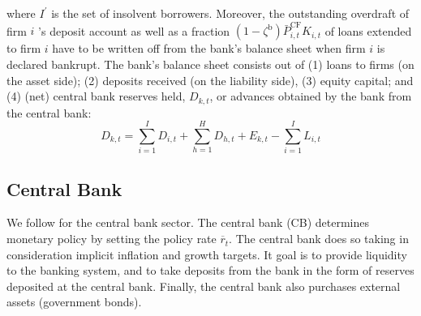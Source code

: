where $I^{\prime}$ is the set of insolvent borrowers. Moreover, the outstanding overdraft of firm $i$ 's deposit account as well as a fraction $\left(1-\zeta^{\mathrm{b}}\right) \bar{P}_{i,t}^{\mathrm{CF}} K_{i,t}$ of loans extended to firm $i$ have to be written off from the bank's balance sheet when firm $i$ is declared bankrupt. The bank's balance sheet consists out of (1) loans to firms (on the asset side); (2) deposits received (on the liability side), (3) equity capital; and (4) (net) central bank reserves held, $D_{k,t}$, or advances obtained by the bank from the central bank: 
\begin{equation}
    D_{k,t}=\sum_{i=1}^I D_{i,t}+\sum_{h=1}^H D_{h,t}+E_{k,t}-\sum_{i=1}^I L_{i,t}
    \label{eq:bankreserves}
\end{equation}
\subsection{Central Bank}
We follow \cite{poledna_economic_2019} for the central bank sector. The central bank (CB) determines monetary policy by setting the policy rate $\overline{r}_t$. The central bank does so taking in consideration implicit inflation and growth targets. It goal is to provide liquidity to the banking system, and to take deposits from the bank in the form of reserves deposited at the central bank. Finally, the central bank also purchases external assets (government bonds).
